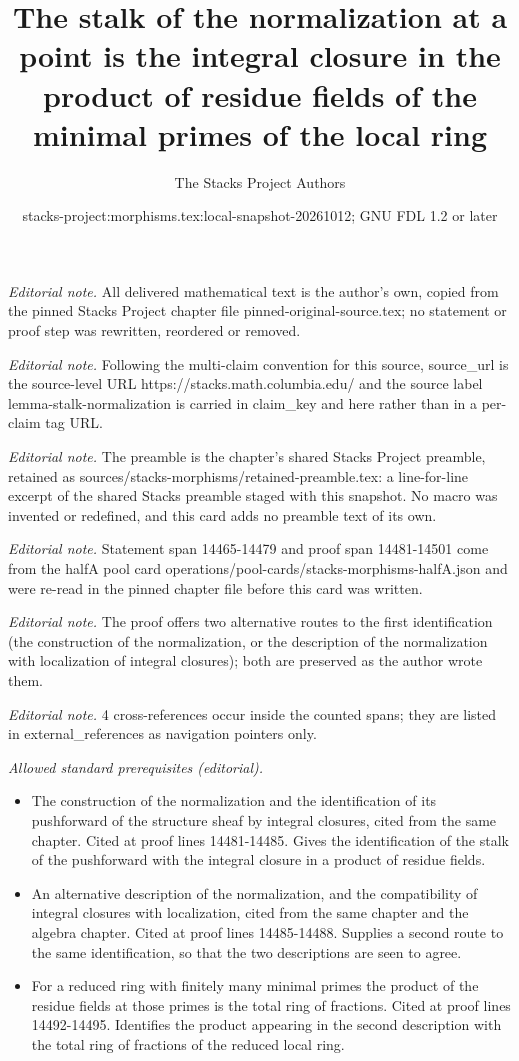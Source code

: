 \documentclass[10pt,a4paper]{amsart}
\title{The stalk of the normalization at a point is the integral closure in the product of residue fields of the minimal primes of the local ring}
\author{The Stacks Project Authors}
\date{stacks-project:morphisms.tex:local-snapshot-20261012; GNU FDL 1.2 or later}
\theoremstyle{plain}
\theoremstyle{definition}
\theoremstyle{remark}
\numberwithin{equation}{subsection}
\begin{document}
\maketitle
\noindent\textit{Editorial note.} All delivered mathematical text is the author's own, copied from the pinned Stacks Project chapter file pinned-original-source.tex; no statement or proof step was rewritten, reordered or removed.\par\medskip
\noindent\textit{Editorial note.} Following the multi-claim convention for this source, source\_url is the source-level URL https://stacks.math.columbia.edu/ and the source label lemma-stalk-normalization is carried in claim\_key and here rather than in a per-claim tag URL.\par\medskip
\noindent\textit{Editorial note.} The preamble is the chapter's shared Stacks Project preamble, retained as sources/stacks-morphisms/retained-preamble.tex: a line-for-line excerpt of the shared Stacks preamble staged with this snapshot. No macro was invented or redefined, and this card adds no preamble text of its own.\par\medskip
\noindent\textit{Editorial note.} Statement span 14465-14479 and proof span 14481-14501 come from the halfA pool card operations/pool-cards/stacks-morphisms-halfA.json and were re-read in the pinned chapter file before this card was written.\par\medskip
\noindent\textit{Editorial note.} The proof offers two alternative routes to the first identification (the construction of the normalization, or the description of the normalization with localization of integral closures); both are preserved as the author wrote them.\par\medskip
\noindent\textit{Editorial note.} 4 cross-references occur inside the counted spans; they are listed in external\_references as navigation pointers only.\par\medskip
\noindent\textit{Allowed standard prerequisites (editorial).}\begin{itemize}
\item The construction of the normalization and the identification of its pushforward of the structure sheaf by integral closures, cited from the same chapter. Cited at proof lines 14481-14485. Gives the identification of the stalk of the pushforward with the integral closure in a product of residue fields.
\item An alternative description of the normalization, and the compatibility of integral closures with localization, cited from the same chapter and the algebra chapter. Cited at proof lines 14485-14488. Supplies a second route to the same identification, so that the two descriptions are seen to agree.
\item For a reduced ring with finitely many minimal primes the product of the residue fields at those primes is the total ring of fractions. Cited at proof lines 14492-14495. Identifies the product appearing in the second description with the total ring of fractions of the reduced local ring.
\end{itemize}\medskip
\end{document}
